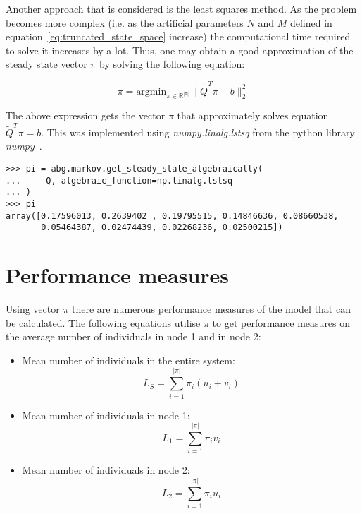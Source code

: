 Another approach that is considered is the least squares method.
As the problem becomes more complex (i.e. as the artificial parameters \(N\)
and \(M\) defined in equation~\eqref{eq:truncated_state_space} increase)
the computational time required to solve it increases by a lot.
Thus, one may obtain a good approximation of the steady state vector \( \pi \)
by solving the following equation:

\begin{equation}
    \pi = \text{argmin}_{\pi \in \mathbb{R}^{|\pi|}}\|\tilde Q^T \pi - b\|_2^2
\end{equation}

The above expression gets the vector \( \pi \) that approximately solves
equation \(\tilde Q^T \pi = b\).
This was implemented using \textit{numpy.linalg.lstsq} from the python
library \textit{numpy}~\cite{2020NumPy-Array}.

\begin{lstlisting}[style=pystyle]
>>> pi = abg.markov.get_steady_state_algebraically(
...     Q, algebraic_function=np.linalg.lstsq
... )
>>> pi
array([0.17596013, 0.2639402 , 0.19795515, 0.14846636, 0.08660538,
       0.05464387, 0.02474439, 0.02268236, 0.02500215])

\end{lstlisting}





\section{Performance measures}
Using vector \(\pi\) there are numerous performance measures of the model that
can be calculated.
The following equations utilise \(\pi\) to get performance measures on the
average number of individuals in node 1 and in node 2:

\begin{itemize}
    \item Mean number of individuals in the entire system:
        \begin{equation}
            L_S = \sum_{i=1}^{|\pi|} \pi_i (u_i + v_i)
        \end{equation}
    \item Mean number of individuals in node 1:
        \begin{equation}
            L_1 = \sum_{i=1}^{|\pi|} \pi_i v_i
        \end{equation}
    \item Mean number of individuals in node 2:
        \begin{equation}
            L_2 = \sum_{i=1}^{|\pi|} \pi_i u_i
        \end{equation}
\end{itemize}

